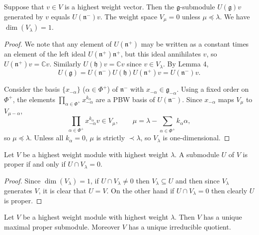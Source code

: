 \documentclass[12pt]{article}
\begin{document}
\begin{proposition}
    Suppose that $v \in V$ is a highest weight vector. Then the $\mathfrak{g}$-submodule $U(\mathfrak{g})v$ generated by $v$ equals $U(\mathfrak{n}^-)v$. The weight space $V_\mu = 0$ unless $\mu \preceq \lambda$. We have $\dim(V_\lambda) = 1$.
\end{proposition}

\begin{proof}
    We note that any element of $U(\mathfrak{n}^+)$ may be written as a constant times an element of the left ideal $U(\mathfrak{n}^+)\mathfrak{n}^+$, but this ideal annihilates $v$, so $U(\mathfrak{n}^+)v = \mathbb{C}v$. Similarly $U(\mathfrak{h})v = \mathbb{C}v$ since $v \in V_\lambda$. By Lemma 4,
    \[
        U(\mathfrak{g}) = U(\mathfrak{n}^-)U(\mathfrak{h})U(\mathfrak{n}^+)v = U(\mathfrak{n}^-)v.
    \]

    Consider the basis $\{x_{-\alpha}\}$ ($\alpha \in \Phi^+$) of $\mathfrak{n}^-$ with $x_{-\alpha} \in \mathfrak{g}_{-\alpha}$. Using a fixed order on $\Phi^+$, the elements $\prod_{\alpha \in \Phi^+} x_{-\alpha}^{k_\alpha}$ are a PBW basis of $U(\mathfrak{n}^-)$. Since $x_{-\alpha}$ maps $V_\mu$ to $V_{\mu-\alpha}$,
    \[
        \prod_{\alpha \in \Phi^+} x_{-\alpha}^{k_\alpha} v \in V_\mu,
        \qquad \mu = \lambda - \sum_{\alpha \in \Phi^+} k_\alpha \alpha,
    \]
    so $\mu \preceq \lambda$. Unless all $k_\alpha = 0$, $\mu$ is strictly $\prec \lambda$, so $V_\lambda$ is one-dimensional.
\end{proof}

\begin{proposition}
    Let $V$ be a highest weight module with highest weight $\lambda$. A submodule $U$ of $V$ is proper if and only if $U \cap V_\lambda = 0$.
\end{proposition}

\begin{proof}
    Since $\dim(V_\lambda) = 1$, if $U \cap V_\lambda \neq 0$ then $V_\lambda \subseteq U$ and then since $V_\lambda$ generates $V$, it is clear that $U = V$. On the other hand if $U \cap V_\lambda = 0$ then clearly $U$ is proper.
\end{proof}

\begin{proposition}
    Let $V$ be a highest weight module with highest weight $\lambda$. Then $V$ has a unique maximal proper submodule. Moreover $V$ has a unique irreducible quotient.
\end{proposition}
\end{document}
